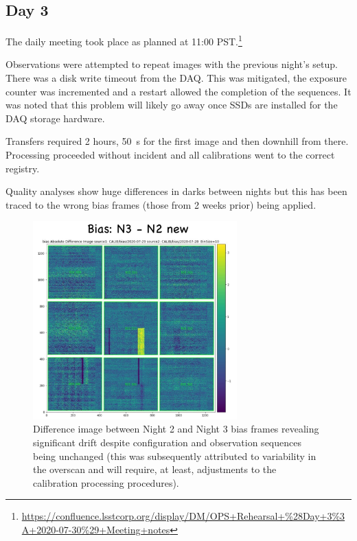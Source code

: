 \subsection{Day 3} \label{sec:day3}

The daily meeting took place as planned at 11:00 PST.\footnote{\url{https://confluence.lsstcorp.org/display/DM/OPS+Rehearsal+\%28Day+3\%3A+2020-07-30\%29+Meeting+notes}}

Observations were attempted to repeat images with the previous night's setup.  There was a
disk write timeout from the DAQ.  This was mitigated, the exposure counter was incremented
and a restart allowed the completion of the sequences.  It was noted that this
problem will likely go away once SSDs are installed for the DAQ storage hardware.

Transfers required 2 hours, 50~s for the first image and then downhill from there.
Processing proceeded without incident and all calibrations went to the correct
registry.

Quality analyses show huge differences in darks between nights but this has been
traced to the wrong bias frames (those from 2 weeks prior) being applied.


\begin{figure}

\begin{center}
\includegraphics[width=0.7\textwidth]{figures/n3-2}
\end{center}
	\caption{Difference image between Night 2 and Night 3 bias frames revealing significant drift despite configuration and observation sequences being unchanged (this was subsequently attributed to variability in the overscan and will require, at least, adjustments to the calibration processing procedures).\label{fig:d3}}
\end{figure}


